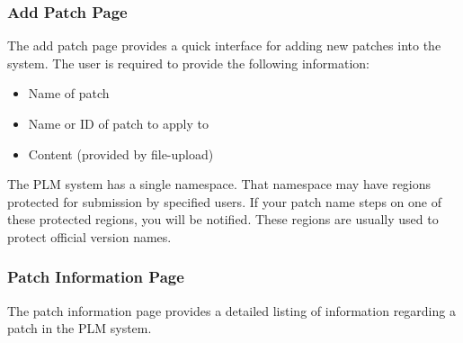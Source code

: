 \subsubsection{Add Patch Page}
The add patch page provides a quick interface for adding new patches into the
system.  The user is required to provide the following information:

\begin{itemize}
\item Name of patch
\item Name or ID of patch to apply to
\item Content (provided by file-upload)
\end{itemize}

\begin{center}
\end{center}

The PLM system has a single namespace.  That namespace may have regions 
protected for submission by specified users.  If your patch name steps on one
of these protected regions, you will be notified.  These regions are usually
used to protect official version names.

\subsubsection{Patch Information Page}
The patch information page provides a detailed listing of information regarding
a patch in the PLM system.  

